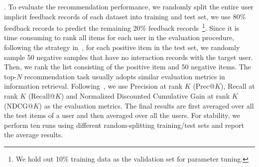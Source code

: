 . To evaluate the recommendation performance, we randomly split the entire user implicit feedback records of each dataset into training and test set, \ie we use 80\% feedback records to predict the remaining 20\% feedback records~\footnote{We hold out 10\% training data as the validation set for parameter tuning. }. Since it is time consuming to rank all items for each user in the evaluation procedure, following the strategy in~\cite{he2017neural},
for each positive item in the test set, we randomly sample 50 negative samples that have no interaction records with the target user.
Then, we rank the list consisting of the positive item and 50 negative items.
The top-$N$ recommendation task usually adopts similar evaluation metrics in information retrieval. Following~\cite{yu2014personalized,he2017neural}, we use  Precision at rank $K$ (Prec@$K$),  Recall at rank $K$ (Recall@$K$) and Normalized Discounted Cumulative Gain at rank $K$ (NDCG@$K$) as the evaluation metrics.
The final results are first averaged over all the test items of a user and then averaged over all the users.  For stability, we perform ten runs using different random-splitting training/test sets and report the average results.

